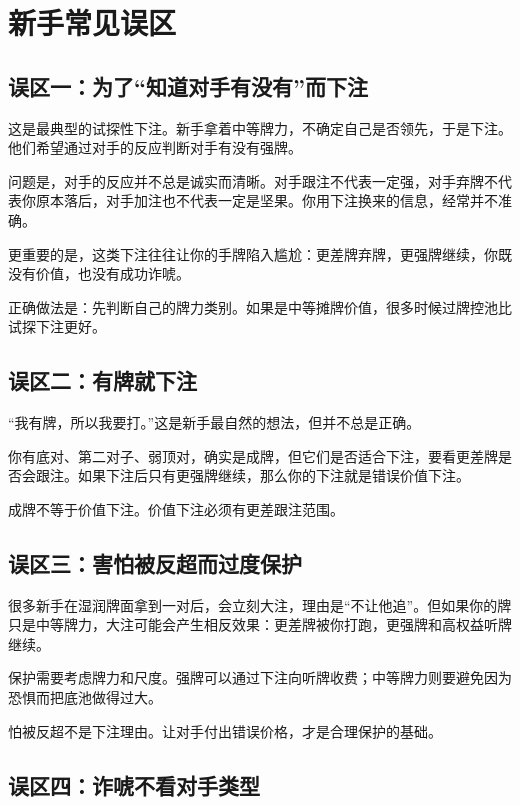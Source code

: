 \section{新手常见误区}

\subsection{误区一：为了“知道对手有没有”而下注}

这是最典型的试探性下注。新手拿着中等牌力，不确定自己是否领先，于是下注。他们希望通过对手的反应判断对手有没有强牌。

问题是，对手的反应并不总是诚实而清晰。对手跟注不代表一定强，对手弃牌不代表你原本落后，对手加注也不代表一定是坚果。你用下注换来的信息，经常并不准确。

更重要的是，这类下注往往让你的手牌陷入尴尬：更差牌弃牌，更强牌继续，你既没有价值，也没有成功诈唬。

正确做法是：先判断自己的牌力类别。如果是中等摊牌价值，很多时候过牌控池比试探下注更好。

\subsection{误区二：有牌就下注}

“我有牌，所以我要打。”这是新手最自然的想法，但并不总是正确。

你有底对、第二对子、弱顶对，确实是成牌，但它们是否适合下注，要看更差牌是否会跟注。如果下注后只有更强牌继续，那么你的下注就是错误价值下注。

成牌不等于价值下注。价值下注必须有更差跟注范围。

\subsection{误区三：害怕被反超而过度保护}

很多新手在湿润牌面拿到一对后，会立刻大注，理由是“不让他追”。但如果你的牌只是中等牌力，大注可能会产生相反效果：更差牌被你打跑，更强牌和高权益听牌继续。

保护需要考虑牌力和尺度。强牌可以通过下注向听牌收费；中等牌力则要避免因为恐惧而把底池做得过大。

怕被反超不是下注理由。让对手付出错误价格，才是合理保护的基础。

\subsection{误区四：诈唬不看对手类型}

